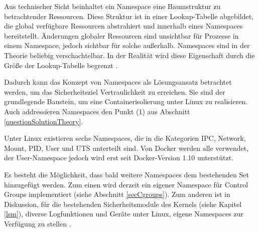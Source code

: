 \documentclass[../main.tex]{subfiles}
\begin{document}




		Aus technischer Sicht beinhaltet ein Namespace eine Baumstruktur zu betrachtender Ressourcen. Diese Struktur ist in einer Lookup-Tabelle abgebildet, die global verfügbare Ressourcen abstrahiert und innerhalb eines Namespaces bereitstellt. Änderungen globaler Ressourcen sind unsichtbar für Prozesse in einem Namespace, jedoch sichtbar für solche außerhalb. Namespaces sind in der Theorie beliebig verschachtelbar. In der Realität wird diese Eigenschaft durch die Größe der Lookup-Tabelle begrenzt \cite[S.1f.]{IBMcheckpointRestart}\cite{namespaces}.

		Dadurch kann das Konzept von Namespaces als Lösungsansatz betrachtet werden, um das Sicherheitsziel Vertraulichkeit zu erreichen. Sie sind der grundlegende Baustein, um eine Containerisolierung unter Linux zu realisieren. Auch addressieren Namespaces den Punkt (1) aus Abschnitt \ref{questionSolutionTheory}.

		Unter Linux existieren sechs Namespaces, die in die Kategorien IPC, Network, Mount, PID, User und UTS unterteilt sind. Von Docker werden alle verwendet, der User-Namespace jedoch wird erst seit Docker-Version 1.10 unterstützt.

		Es besteht die Möglichkeit, dass bald weitere Namespaces dem bestehenden Set hinzugefügt werden. Zum einen wird derzeit ein eigener Namespace für Control Groups implementiert (siehe Abschnitt \ref{secCgroups}). Zum anderen ist in Diskussion, für die bestehenden Sicherheitsmodule des Kernels (siehe Kapitel \ref{lsm}), diverse Logfunktionen und Geräte unter Linux, eigene Namespaces zur Verfügung zu stellen \cite[S.19]{presContainerSec}.


\end{document}

